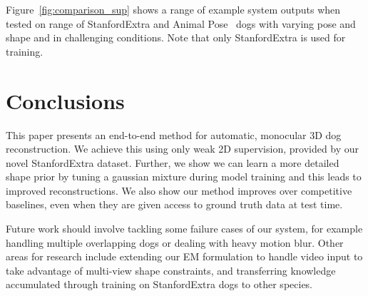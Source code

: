 Figure~\ref{fig:comparison_sup} shows a range of example system outputs when tested on range of StanfordExtra and Animal Pose~\cite{animalpose} dogs with varying pose and shape and in challenging conditions. Note that only StanfordExtra is used for training.


% 

% 

% 

\section{Conclusions}
This paper presents an end-to-end method for automatic, monocular 3D dog reconstruction. We achieve this using only weak 2D supervision, provided by our novel StanfordExtra dataset. Further, we show we can learn a more detailed shape prior by tuning a gaussian mixture during model training and this leads to improved reconstructions. We also show our method improves over competitive baselines, even when they are given access to ground truth data at test time.

Future work should involve tackling some failure cases of our system, for example handling multiple overlapping dogs or dealing with heavy motion blur. Other areas for research include extending our EM formulation to handle video input to take advantage of multi-view shape constraints, and transferring knowledge accumulated through training on StanfordExtra dogs to other species.

